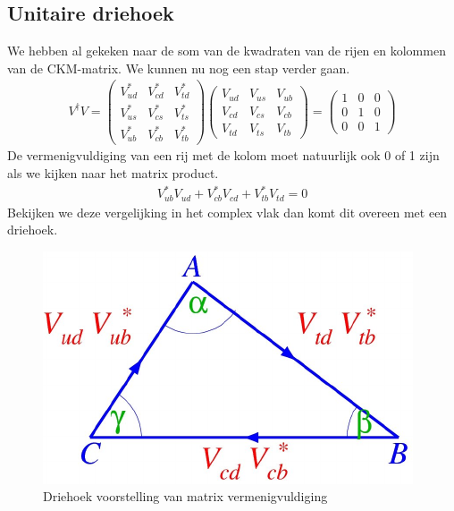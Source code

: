 \documentclass[../main.tex]{subfiles}
\begin{document}
\subsection{Unitaire driehoek}%
\label{sub:unitaire_driehoek}

We hebben al gekeken naar de som van de kwadraten van de rijen en kolommen van de CKM-matrix. We kunnen nu nog een stap verder gaan.
\begin{equation}
    \begin{aligned}
        \label{eq:unitaire_driehoek}
        V^{\dagger} V=\left(\begin{array}{ccc}
                V_{u d}^{*} & V_{c d}^{*} & V_{t d}^{*} \\
                V_{u s}^{*} & V_{c s}^{*} & V_{t s}^{*} \\
                V_{u b}^{*} & V_{c b}^{*} & V_{t b}^{*}
                \end{array}\right)\left(\begin{array}{ccc}
                V_{u d} & V_{u s} & V_{u b} \\
                V_{c d} & V_{c s} & V_{c b} \\
                V_{t d} & V_{t s} & V_{t b}
                \end{array}\right)=\left(\begin{array}{ccc}
                1 & 0 & 0 \\
                0 & 1 & 0 \\
                0 & 0 & 1
        \end{array}\right)
    \end{aligned}
\end{equation}
De vermenigvuldiging van een rij met de kolom moet natuurlijk ook 0 of 1 zijn als we kijken naar het matrix product.
\begin{equation}
    \begin{aligned}
        \label{eq:matrix_vermenigvuldiging}
        V_{u b}^{*} V_{u d}+V_{c b}^{*} V_{c d}+V_{t b}^{*} V_{t d}=0
    \end{aligned}
\end{equation}
Bekijken we deze vergelijking in het complex vlak dan komt dit overeen met een driehoek.

\begin{figure}[h]
    \centering
    \includegraphics[width=0.6\linewidth]{cp_violation/complexe_driehoek.png}
    \caption{Driehoek voorstelling van matrix vermenigvuldiging}%
    \label{fig:cp_violation/complexe_driehoek}
\end{figure}
\end{document}

